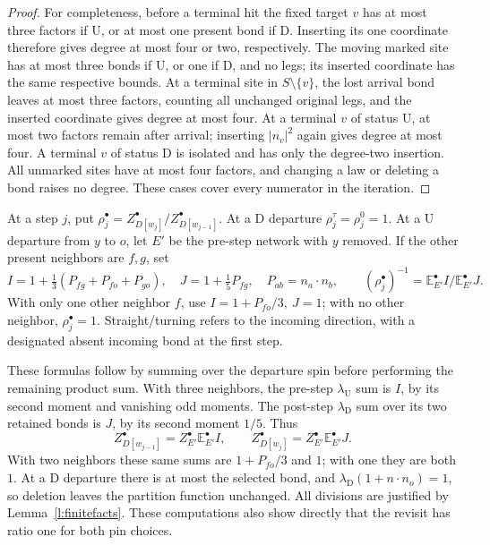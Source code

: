 \begin{proof}
For completeness, before a terminal hit the fixed target \(v\)
has at most three factors if \(\mathrm U\), or at most one
present bond if \(\mathrm D\). Inserting its one coordinate
therefore gives degree at most four or two, respectively.
The moving marked site has at most three bonds if \(\mathrm U\),
or one if \(\mathrm D\), and no legs; its inserted coordinate
has the same respective bounds. At a terminal site in
\(S\setminus\{v\}\), the lost arrival bond leaves at most three
factors, counting all unchanged original legs, and the inserted
coordinate gives degree at most four. At a terminal \(v\) of
status \(\mathrm U\), at most two factors remain after arrival;
inserting \(|n_v|^2\) again gives degree at most four.
A terminal \(v\) of status \(\mathrm D\) is isolated and has
only the degree-two insertion. All unmarked sites have at most
four factors, and changing a law or deleting a bond raises no
degree. These cases cover every numerator in the iteration.
\end{proof}

\begin{definition}\label{d:ratios}
At a step \(j\), put
\(\rho_j^\bullet=Z^\bullet_{D[w_j]}/Z^\bullet_{D[w_{j-1}]}\).
At a \(\mathrm D\) departure \(\rho_j^\tau=\rho_j^0=1\).
At a \(\mathrm U\) departure from \(y\) to \(o\), let \(E'\)
be the pre-step network with \(y\) removed.
If the other present neighbors are \(f,g\), set
\[
 I=1+\tfrac13(P_{fg}+P_{fo}+P_{go}),\quad
 J=1+\tfrac15P_{fg},\quad P_{ab}=n_a\cdot n_b,\qquad
 (\rho_j^\bullet)^{-1}=\mathbb E_{E'}^\bullet I/
                                      \mathbb E_{E'}^\bullet J.
\]
With only one other neighbor \(f\), use \(I=1+P_{fo}/3,\ J=1\);
with no other neighbor, \(\rho_j^\bullet=1\).
Straight/turning refers to the incoming direction, with a designated
absent incoming bond at the first step.
\end{definition}

These formulas follow by summing over the departure spin before
performing the remaining product sum. With three neighbors, the
pre-step \(\lambda_{\mathrm U}\) sum is \(I\), by its second
moment and vanishing odd moments. The post-step
\(\lambda_{\mathrm D}\) sum over its two retained bonds is \(J\),
by its second moment \(1/5\). Thus
\[
 Z^\bullet_{D[w_{j-1}]}=Z^\bullet_{E'}\mathbb E^\bullet_{E'}I,
 \qquad
 Z^\bullet_{D[w_j]}=Z^\bullet_{E'}\mathbb E^\bullet_{E'}J.
\]
With two neighbors these same sums are \(1+P_{fo}/3\) and \(1\);
with one they are both \(1\). At a \(\mathrm D\) departure
there is at most the selected bond, and
\(\lambda_{\mathrm D}(1+n\cdot n_o)=1\), so deletion leaves
the partition function unchanged. All divisions are justified by
Lemma~\ref{l:finitefacts}. These computations also show directly
that the revisit has ratio one for both pin choices.

